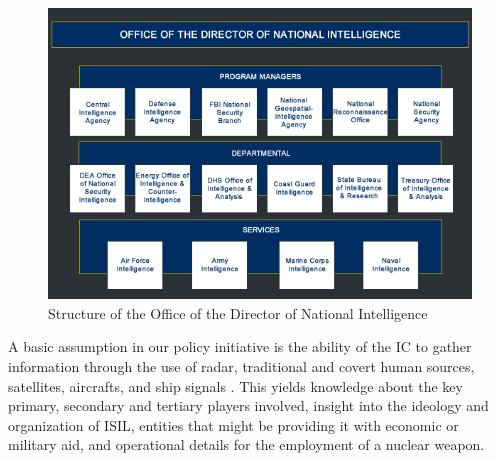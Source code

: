 \documentclass{report}
\begin{document}
\begin{figure}
 \centering
 \includegraphics[trim = 0cm 0cm 0cm 0cm, clip,scale=0.7]{./figures/structure_infographic.jpg}
   \caption{Structure of the Office of the Director of National Intelligence \cite{OfficeoftheDirectorofNationalIntelligence}}
     \label{fig:structure_infographic}
\end{figure}

A basic assumption in our policy initiative is the ability of the IC to gather information through the use of radar, traditional and covert human sources, satellites, aircrafts, and ship signals \cite{Richelson2011}. This yields knowledge about the key primary, secondary and tertiary players involved, insight into the ideology and organization of ISIL, entities that might be providing it with economic or military aid, and operational details for the employment of a nuclear weapon.
\end{document}
